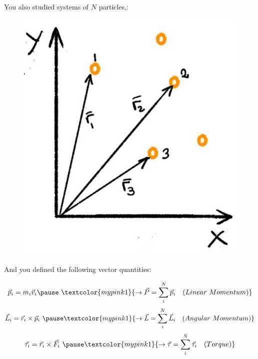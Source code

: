 \documentclass[]{beamer}
\begin{document}
\begin{frame}

You also studied systems of $N$ particles,: 




  \begin{figure}[h!]
    \begin{center}
      \includegraphics[height=2.in]{images/1.jpg}
    \end{center}
  \end{figure}

  







 \end{frame}

 

\begin{frame}

 And you defined the following vector quantities: 
  

  
    \pause
  
    \begin{equation}
      \vec{p}_i=m_i\vec{v}_i \pause ~ \textcolor{mypink1}{\rightarrow \vec{P}=\sum^N_i \vec{p}_i~~~(Linear~Momentum)}
    \end{equation}
    \pause
    \begin{equation}
      \vec{L}_i=\vec{r}_i\times\vec{p}_i ~ \pause \textcolor{mypink1}{\rightarrow \vec{L}=\sum^N_i \vec{L}_i~~~(Angular~Momentum)}
    \end{equation}
    \pause
    \begin{equation}
      \vec{\tau}_i=\vec{r}_i\times\vec{F}_i ~ \pause \textcolor{mypink1}{\rightarrow \vec{\tau}=\sum^N_i \vec{\tau}_i~~~(Torque)}
    \end{equation}

  
  
  
  
  
   \end{frame}
\end{document}
